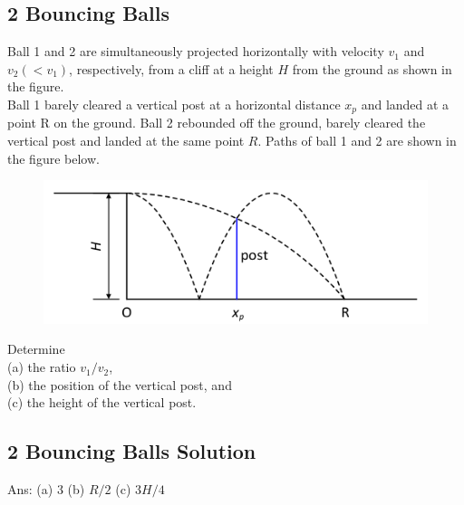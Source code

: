\documentclass{article}
\begin{document}
\subsection{2 Bouncing Balls}
Ball 1 and 2 are simultaneously projected horizontally with velocity $v_1$ and $v_2\left(<v_1\right)$, respectively, from a cliff at a height $H$ from the ground as shown in the figure.\\[10pt]
Ball 1 barely cleared a vertical post at a horizontal distance $x_p$ and landed at a point $\mathrm{R}$ on the ground. Ball 2 rebounded off the ground, barely cleared the vertical post and landed at the same point $R$. Paths of ball 1 and 2 are shown in the figure below.
\begin{figure}[h]
    \centering
\includegraphics[width=0.8\linewidth]{images/2bouncingballs.png}
\end{figure}
Determine\\[5pt] 
(a) the ratio $v_1 / v_2$, \\[5pt]
(b) the position of the vertical post, and \\[5pt]
(c) the height of the vertical post. 
\clearpage 
\subsection{2 Bouncing Balls Solution}
Ans: (a) 3 (b) $R/2$ (c) $3H/4$
\clearpage 
\end{document}
